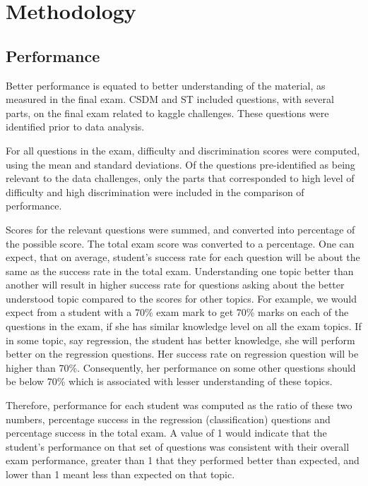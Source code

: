 \documentclass[12pt]{article}
\begin{document}
\section{Methodology}\label{methodology}

\subsection{Performance}\label{performance}

Better performance is equated to better understanding of the material,
as measured in the final exam. CSDM and ST included questions, with
several parts, on the final exam related to kaggle challenges. These
questions were identified prior to data analysis.

For all questions in the exam, difficulty and discrimination scores were
computed, using the mean and standard deviations. Of the questions
pre-identified as being relevant to the data challenges, only the parts
that corresponded to high level of difficulty and high discrimination
were included in the comparison of performance.

Scores for the relevant questions were summed, and converted into
percentage of the possible score. The total exam score was converted to
a percentage. One can expect, that on average, student's success rate
for each question will be about the same as the success rate in the
total exam. Understanding one topic better than another will result in
higher success rate for questions asking about the better understood
topic compared to the scores for other topics. For example, we would
expect from a student with a 70\% exam mark to get 70\% marks on each of
the questions in the exam, if she has similar knowledge level on all the
exam topics. If in some topic, say regression, the student has better
knowledge, she will perform better on the regression questions. Her
success rate on regression question will be higher than 70\%.
Consequently, her performance on some other questions should be below
70\% which is associated with lesser understanding of these topics.

Therefore, performance for each student was computed as the ratio of
these two numbers, percentage success in the regression (classification)
questions and percentage success in the total exam. A value of 1 would
indicate that the student's performance on that set of questions was
consistent with their overall exam performance, greater than 1 that they
performed better than expected, and lower than 1 meant less than
expected on that topic.
\end{document}
